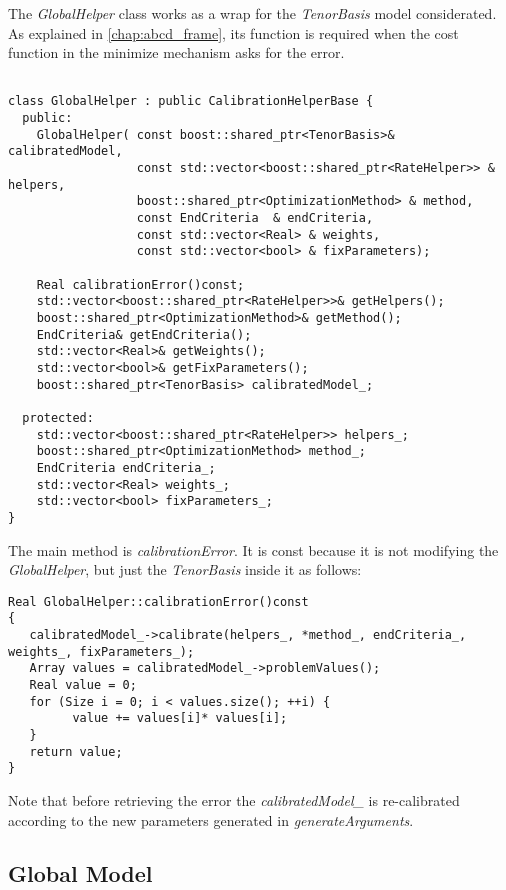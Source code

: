 The \textit{GlobalHelper} class works as a wrap for the \textit{TenorBasis} model considerated. As explained in \eqref{chap:abcd_frame}, its function is required when the cost function in the minimize mechanism asks for the error.

\begin{lstlisting}

class GlobalHelper : public CalibrationHelperBase {
  public:
    GlobalHelper( const boost::shared_ptr<TenorBasis>& calibratedModel,
                  const std::vector<boost::shared_ptr<RateHelper>> & helpers,
                  boost::shared_ptr<OptimizationMethod> & method,
                  const EndCriteria  & endCriteria,
                  const std::vector<Real> & weights,
                  const std::vector<bool> & fixParameters);

    Real calibrationError()const;
    std::vector<boost::shared_ptr<RateHelper>>& getHelpers();
    boost::shared_ptr<OptimizationMethod>& getMethod();
    EndCriteria& getEndCriteria();
    std::vector<Real>& getWeights();
    std::vector<bool>& getFixParameters();
    boost::shared_ptr<TenorBasis> calibratedModel_;

  protected:
    std::vector<boost::shared_ptr<RateHelper>> helpers_;
    boost::shared_ptr<OptimizationMethod> method_;
    EndCriteria endCriteria_;
    std::vector<Real> weights_;
    std::vector<bool> fixParameters_;
}

\end{lstlisting}

The main method is \textit{calibrationError}. It is const because it is not modifying the \textit{GlobalHelper}, but just the \textit{TenorBasis} inside it as follows:

\begin{lstlisting}
Real GlobalHelper::calibrationError()const
{
   calibratedModel_->calibrate(helpers_, *method_, endCriteria_, weights_, fixParameters_);
   Array values = calibratedModel_->problemValues();
   Real value = 0;
   for (Size i = 0; i < values.size(); ++i) {
         value += values[i]* values[i];
   }
   return value;
}
\end{lstlisting}

Note that before retrieving the error the \textit{calibratedModel\_} is re-calibrated according to the new parameters generated in \textit{generateArguments}.

\subsection{Global Model}

